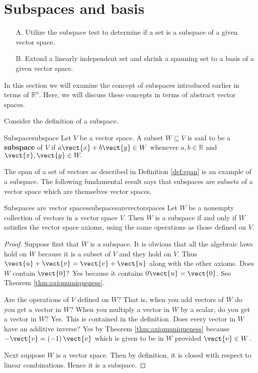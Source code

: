 \section{Subspaces and basis}

\begin{outcome}
\begin{enumerate}
\item[A.] Utilize the subspace test to determine if a set is a subspace of a given vector space.

\item[B.] Extend a linearly independent set and shrink a spanning set to a basis of a given vector space. 
\end{enumerate}
\end{outcome}

In this section we will examine the concept of subspaces introduced earlier in terms of $\mathbb{R}^n$. Here, we will discuss these concepts in terms of abstract vector spaces. 

Consider the definition of a subspace.

\begin{definition}{Subspace}{subspace}
Let $V$ be a vector space. A subset $W\subseteq V$ is said to be a \textbf{subspace} of $V$ if $a\vect{x}+b\vect{y}
\in W$ whenever $a,b\in \mathbb{R}$ and $\vect{x},\vect{y}\in W.$
\end{definition}

The span of a set of vectors as described in Definition \ref{def:span} is an example of a subspace. The following fundamental result says that subspaces are subsets of a
vector space which are themselves vector spaces.

\begin{theorem}{Subspaces are vector spaces}{subspacesarevectorspaces}
Let $W$ be a nonempty collection of vectors in a vector space $V$. Then $W$
is a subspace if and only if $W$ satisfies the vector space axioms, using the same
operations as those defined on $V$.
\end{theorem}

\begin{proof}
Suppose first that $W$ is a subspace. It is obvious that
all the algebraic laws hold on $W$ because it is a subset of $V$ and they
hold on $V$. Thus $\vect{u}+\vect{v}=\vect{v}+\vect{u}$ along with the other axioms. Does $W$
contain $\vect{0}?$ Yes because it contains $0\vect{u}=\vect{0}$. See
Theorem \ref{thm:axiomuniqueness}.

 Are the operations of $V$ defined on $W?$ That is,
when you add vectors of $W$ do you get a vector in $W?$ When you multiply a
vector in $W$ by a scalar, do you get a vector in $W?$ Yes. This is
contained in the definition. Does every vector in $W$ have an additive
inverse? Yes by Theorem \ref{thm:axiomuniqueness} because $-\vect{v}=\left(
-1\right) \vect{v}$ which is given to be in $W$ provided $\vect{v}\in W$.

Next suppose $W$ is a vector space. Then by definition, it is closed with
respect to linear combinations. Hence it is a subspace. 
\end{proof}

